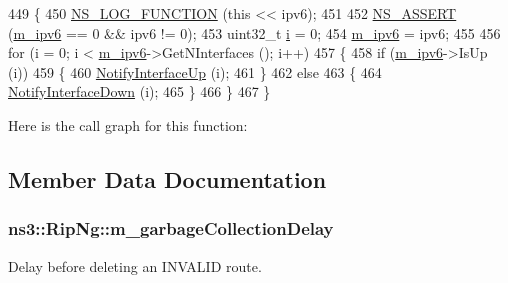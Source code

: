 \begin{DoxyCode}
449 \{
450   \hyperlink{log-macros-disabled_8h_a90b90d5bad1f39cb1b64923ea94c0761}{NS\_LOG\_FUNCTION} (\textcolor{keyword}{this} << ipv6);
451 
452   \hyperlink{assert_8h_a6dccdb0de9b252f60088ce281c49d052}{NS\_ASSERT} (\hyperlink{classns3_1_1RipNg_aca7a023799ce2004499a826ba5d5d3fe}{m\_ipv6} == 0 && ipv6 != 0);
453   uint32\_t \hyperlink{bernuolliDistribution_8m_a6f6ccfcf58b31cb6412107d9d5281426}{i} = 0;
454   \hyperlink{classns3_1_1RipNg_aca7a023799ce2004499a826ba5d5d3fe}{m\_ipv6} = ipv6;
455 
456   \textcolor{keywordflow}{for} (i = 0; i < \hyperlink{classns3_1_1RipNg_aca7a023799ce2004499a826ba5d5d3fe}{m\_ipv6}->GetNInterfaces (); i++)
457     \{
458       \textcolor{keywordflow}{if} (\hyperlink{classns3_1_1RipNg_aca7a023799ce2004499a826ba5d5d3fe}{m\_ipv6}->IsUp (i))
459         \{
460           \hyperlink{classns3_1_1RipNg_a588e191ae91316e498a8e5c84a9c77fb}{NotifyInterfaceUp} (i);
461         \}
462       \textcolor{keywordflow}{else}
463         \{
464           \hyperlink{classns3_1_1RipNg_a2031124814e8d817d0a40dddb7327a1b}{NotifyInterfaceDown} (i);
465         \}
466     \}
467 \}
\end{DoxyCode}


Here is the call graph for this function\+:




\subsection{Member Data Documentation}
\subsubsection[{\texorpdfstring{m\+\_\+garbage\+Collection\+Delay}{m_garbageCollectionDelay}}]{ ns3\+::\+Rip\+Ng\+::m\+\_\+garbage\+Collection\+Delay\hspace{0.3cm}{\ttfamily [private]}}\hypertarget{classns3_1_1RipNg_aa42bd385be7a330206d02e2e721edc19}{}\label{classns3_1_1RipNg_aa42bd385be7a330206d02e2e721edc19}


Delay before deleting an I\+N\+V\+A\+L\+ID route. 

